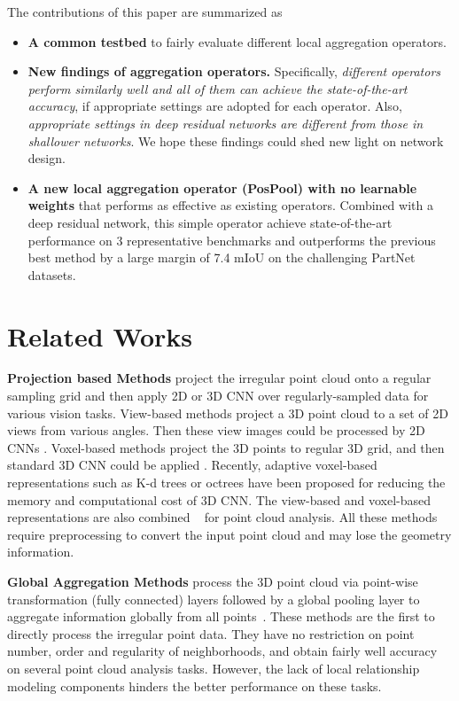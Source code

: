 \documentclass[runningheads]{llncs}
\begin{document}
The contributions of this paper are summarized as
\begin{itemize}
    \item \textbf{A common testbed} to fairly evaluate different local aggregation operators.
    \item \textbf{New findings of aggregation operators.} Specifically, \emph{different operators perform similarly well and all of them can achieve the state-of-the-art accuracy}, if appropriate settings are adopted for each operator. Also, \emph{appropriate settings in deep residual networks are different from those in shallower networks}. We hope these findings could shed new light on network design.
    \item \textbf{A new local aggregation operator (PosPool) with no learnable weights} that performs as effective as existing operators. Combined with a deep residual network, this simple operator achieve state-of-the-art performance on 3 representative benchmarks and outperforms the previous best method by a large margin of 7.4 mIoU on the challenging PartNet datasets.
\end{itemize}

\section{Related Works}

\vspace{0.3em} \noindent \textbf{Projection based Methods} project the irregular point cloud onto a regular sampling grid and then apply 2D or 3D CNN over regularly-sampled data for various vision tasks. View-based methods project a 3D point cloud to a set of 2D views from various angles. Then these view images could be processed by 2D CNNs \cite{feng2018gvcnn,guo2016multiview3d,qi2016volumetric,su2015multi}. Voxel-based methods project the 3D points to regular 3D grid, and then standard 3D CNN could be applied \cite{gadelha2018multiresolution,maturana2015voxnet,wu20153d}. Recently, adaptive voxel-based representations such as K-d trees \cite{klokov2017kdnet} or octrees \cite{riegler2017octnet,tatarchenko2017octree,wang2017ocnn} have been proposed for reducing the memory and computational cost of 3D CNN. The view-based and voxel-based representations are also combined ~\cite{qi2016volumetric} for point cloud analysis. All these methods require preprocessing to convert the input point cloud and may lose the geometry information.

\vspace{0.3em} \noindent \textbf{Global Aggregation Methods} process the 3D point cloud via point-wise  transformation (fully connected) layers followed by a global pooling layer to aggregate information globally from all points~\cite{qi2017pointnet}. These methods are the first to directly process the irregular point data. They have no restriction on point number, order and regularity of neighborhoods, and obtain fairly well accuracy on several point cloud analysis tasks. However, the lack of local relationship modeling components hinders the better performance on these tasks.
\end{document}
